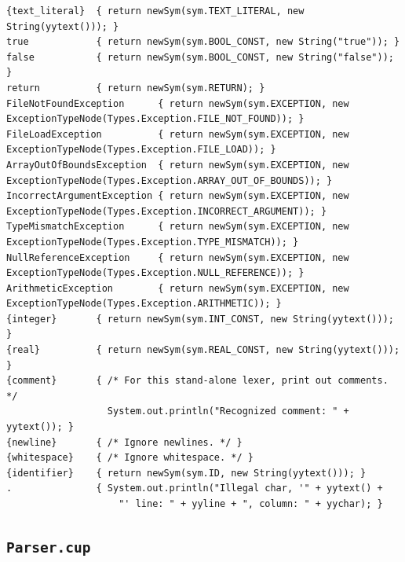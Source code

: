 \documentclass{book}
\begin{document}
\begin{verbatim}
{text_literal}  { return newSym(sym.TEXT_LITERAL, new String(yytext())); }
true            { return newSym(sym.BOOL_CONST, new String("true")); }
false           { return newSym(sym.BOOL_CONST, new String("false")); }
return          { return newSym(sym.RETURN); }
FileNotFoundException      { return newSym(sym.EXCEPTION, new ExceptionTypeNode(Types.Exception.FILE_NOT_FOUND)); }
FileLoadException          { return newSym(sym.EXCEPTION, new ExceptionTypeNode(Types.Exception.FILE_LOAD)); }
ArrayOutOfBoundsException  { return newSym(sym.EXCEPTION, new ExceptionTypeNode(Types.Exception.ARRAY_OUT_OF_BOUNDS)); } 
IncorrectArgumentException { return newSym(sym.EXCEPTION, new ExceptionTypeNode(Types.Exception.INCORRECT_ARGUMENT)); }
TypeMismatchException      { return newSym(sym.EXCEPTION, new ExceptionTypeNode(Types.Exception.TYPE_MISMATCH)); }
NullReferenceException     { return newSym(sym.EXCEPTION, new ExceptionTypeNode(Types.Exception.NULL_REFERENCE)); }
ArithmeticException        { return newSym(sym.EXCEPTION, new ExceptionTypeNode(Types.Exception.ARITHMETIC)); }
{integer}       { return newSym(sym.INT_CONST, new String(yytext())); }
{real}          { return newSym(sym.REAL_CONST, new String(yytext())); }
{comment}       { /* For this stand-alone lexer, print out comments. */
                  System.out.println("Recognized comment: " + yytext()); }
{newline}       { /* Ignore newlines. */ }
{whitespace}    { /* Ignore whitespace. */ }
{identifier}    { return newSym(sym.ID, new String(yytext())); }
.               { System.out.println("Illegal char, '" + yytext() +
                    "' line: " + yyline + ", column: " + yychar); }
\end{verbatim}

\subsection{\texttt{Parser.cup}}
\end{document}

